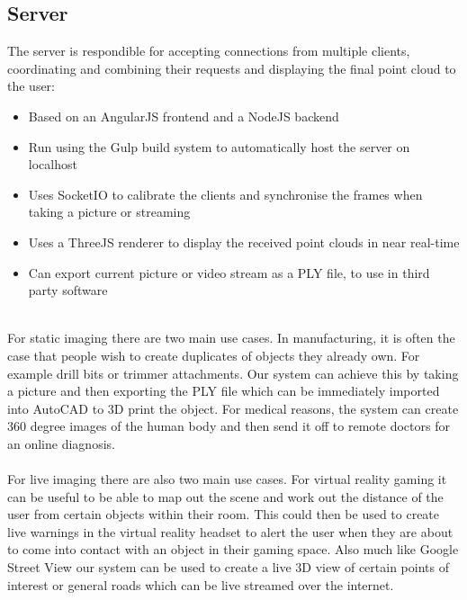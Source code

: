 \documentclass{article}
\begin{document}
\subsection{Server}
The server is respondible for accepting connections from multiple clients, coordinating and combining their requests and displaying the final point cloud to the user:
\begin{itemize}
\item Based on an AngularJS frontend and a NodeJS backend
\item Run using the Gulp build system to automatically host the server on localhost
\item Uses SocketIO to calibrate the clients and synchronise the frames when taking a picture or streaming
\item Uses a ThreeJS renderer to display the received point clouds in near real-time
\item Can export current picture or video stream as a PLY file, to use in third party software
\end{itemize}
~\\
For static imaging there are two main use cases. In manufacturing, it is often the case that people wish to create duplicates of objects they already own. For example drill bits or trimmer attachments. Our system can achieve this by taking a picture and then exporting the PLY file which can be immediately imported into AutoCAD to 3D print the object. For medical reasons, the system can create 360 degree images of the human body and then send it off to remote doctors for an online diagnosis.
\\\\
For live imaging there are also two main use cases. For virtual reality gaming it can be useful to be able to map out the scene and work out the distance of the user from certain objects within their room. This could then be used to create live warnings in the virtual reality headset to alert the user when they are about to come into contact with an object in their gaming space. Also much like Google Street View our system can be used to create a live 3D view of certain points of interest or general roads which can be live streamed over the internet.
\newpage
\end{document}
